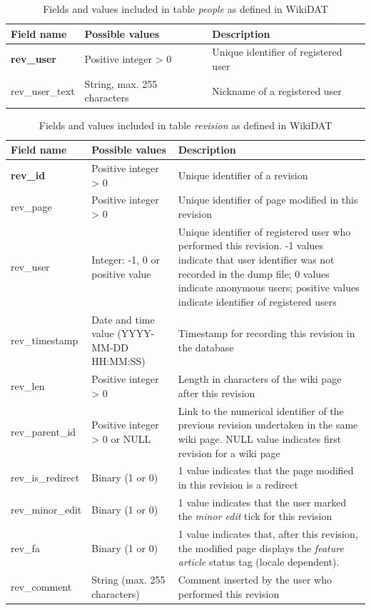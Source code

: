 \begin{longtable}[l]{|m{4.5cm}|m{5cm}|m{5cm}|}
 \caption[Table people in WikiDAT]
  {Fields and values included in table \textit{people} as defined in WikiDAT}
  \label{tab:table-people}\\
  \hline
  {\bfseries Field name} & {\bfseries Possible values} & {\bfseries Description}\\
  \hline
  {\bfseries rev\_user} & Positive integer > 0 & Unique identifier of registered user \\
  \hline
  rev\_user\_text & String, max. 255 characters & Nickname of a registered user \\
  \hline
\end{longtable}

\begin{longtable}[l]{|m{4.5cm}|m{5cm}|m{5cm}|}
 \caption[Table revision in WikiDAT]
  {Fields and values included in table \textit{revision} as defined in WikiDAT}
  \label{tab:table-revision}\\
  \hline
  {\bfseries Field name} & {\bfseries Possible values} & {\bfseries Description}\\
  \hline
  {\bfseries rev\_id} & Positive integer > 0 & Unique identifier of a revision \\
  \hline
  rev\_page & Positive integer > 0 & Unique identifier of page modified in this 
  revision \\
  \hline
  rev\_user & Integer: -1, 0 or positive value & Unique identifier of registered user who performed
  this revision. -1 values indicate that user identifier was not recorded in the
  dump file; 0 values indicate anonymous users; positive values indicate identifier
  of registered users\\
  \hline
  rev\_timestamp & Date and time value (YYYY-MM-DD HH:MM:SS) & Timestamp for recording
  this revision in the database \\
  \hline
  rev\_len & Positive integer > 0  & Length in characters of the wiki page after this
  revision \\
  \hline
  rev\_parent\_id & Positive integer > 0 or NULL & Link to the numerical identifier of the
  previous revision undertaken in the same wiki page. NULL value indicates first revision for
  a wiki page \\
  \hline
  rev\_is\_redirect & Binary (1 or 0) & 1 value indicates that the page modified in this revision
  is a redirect \\
  \hline
  rev\_minor\_edit & Binary (1 or 0) & 1 value indicates that the user marked the \textit{minor
  edit} tick for this revision\\
  \hline
  rev\_fa & Binary (1 or 0) & 1 value indicates that, after this revision, the modified page
  displays the \textit{feature article} status tag (locale dependent). \\
  \hline
  rev\_comment & String (max. 255 characters) & Comment inserted by the user who
  performed this revision \\
  \hline
\end{longtable}

